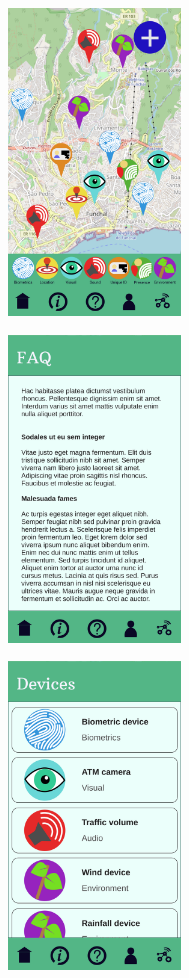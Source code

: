 \begin{figure}[H]
    \centering
    \begin{subfigure}{0.33\textwidth}
        \centering
        \includegraphics[width=130pt]{../assets/images/high_homepage.png}
        \caption{}
        \label{fig:highhome}
    \end{subfigure}%
    \begin{subfigure}{0.33\textwidth}
        \centering
        \includegraphics[width=130pt]{../assets/images/high_more_info.png}
        \caption{}
        \label{fig:highabout}
    \end{subfigure}%
    \begin{subfigure}{0.33\textwidth}
        \centering
        \includegraphics[width=130pt]{../assets/images/high_devices.png}

\end{subfigure}
\end{figure}
